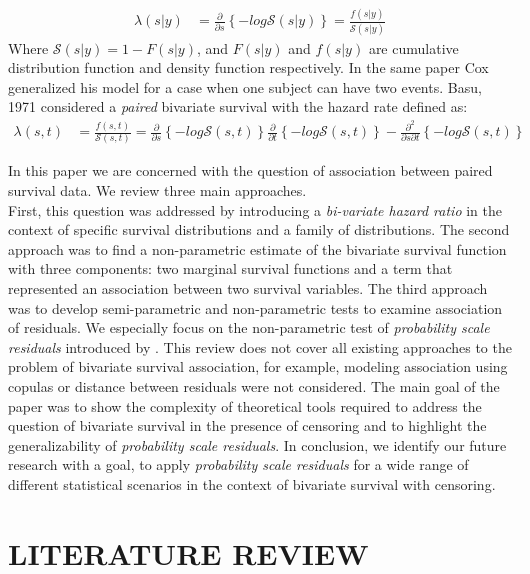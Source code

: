 \documentclass[]{article}
\begin{document}
$$
\begin{aligned}
	\lambda(s|y) &= \frac{\partial}{\partial s}\left\{  -log \mathcal{S}(s|y)  \right\} =
	             \frac{f(s|y)}{\mathcal{S}(s|y)}
\end{aligned}
$$
Where $\mathcal{S}(s|y) = 1-F(s|y)$, and $F(s|y)$ and $f(s|y)$ are cumulative distribution function and density function respectively. In the same paper %
Cox generalized his model for a case when one subject can have two events. 
Basu, 1971 %
considered a \emph{paired} bivariate survival with the hazard rate defined as:
$$
\begin{aligned}
	\lambda(s,t) &= \frac{f(s,t)}{\mathcal{S}(s,t)} = \frac{\partial}{\partial s}\left\{  -log \mathcal{S}(s,t)  \right\}\frac{\partial}{\partial t}\left\{  -log \mathcal{S}(s,t)  \right\} - \frac{\partial^2}{\partial s\partial t}\left\{  -log \mathcal{S}(s,t)  \right\}
\end{aligned}
$$

In this paper we are concerned with the question of association between paired survival data. We review three main approaches.\\
First, this question was addressed by introducing a \emph{bi-variate hazard ratio} in the context of specific survival distributions and a family of distributions. The second approach was to find a non-parametric estimate of the bivariate survival function with three components: two marginal survival functions and a term that represented an association between two survival variables. The third approach was to develop semi-parametric and non-parametric tests to examine association of residuals. We especially focus on the non-parametric test of \emph{probability scale residuals} introduced by \cite{li2012new} . This review does not cover all existing approaches to the problem of bivariate survival association, for example, modeling association using copulas or distance between residuals were not considered. The main goal of the paper was to show the complexity of theoretical tools required to address the question of bivariate survival in the presence of censoring and to highlight the generalizability of \emph{probability scale residuals}. In conclusion, we identify our future research with a goal, to apply \emph{probability scale residuals} for a wide range of different statistical scenarios in the context of bivariate survival with censoring. 

\section{LITERATURE REVIEW}
\end{document}

